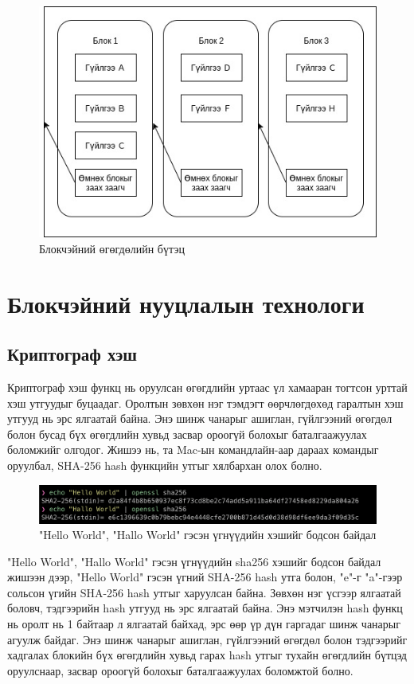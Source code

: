 \begin{figure}[h]
	\centering
	\includegraphics[scale=0.8]{src/images/blockchain-structure.jpg}
	\caption{Блокчэйний өгөгдөлийн бүтэц}
\end{figure}

\section{Блокчэйний нууцлалын технологи}
\subsection{Криптограф хэш}
Криптограф хэш функц нь оруулсан өгөгдлийн уртаас үл хамааран тогтсон урттай хэш утгуудыг буцаадаг. Оролтын зөвхөн нэг тэмдэгт өөрчлөгдөхөд гаралтын хэш утгууд нь эрс ялгаатай байна. Энэ шинж чанарыг ашиглан, гүйлгээний өгөгдөл болон бусад бүх өгөгдлийн хувьд засвар ороогүй болохыг баталгаажуулах боломжийг олгодог.
Жишээ нь, та Mac-ын командлайн-аар дараах командыг оруулбал, SHA-256 hash функцийн утгыг хялбархан олох болно.

\begin{figure}[h]
	\centering
	\includegraphics[scale=0.32]{src/images/hash-example.png}
	\caption{"Hello World", "Hallo World" гэсэн үгнүүдийн хэшийг бодсон байдал}
\end{figure}

"Hello World", "Hallo World" гэсэн үгнүүдийн sha256 хэшийг бодсон байдал жишээн дээр, "Hello World" гэсэн үгний SHA-256 hash утга болон, "e"-г "a"-гээр сольсон үгийн SHA-256 hash утгыг харуулсан байна. Зөвхөн нэг үсгээр ялгаатай боловч, тэдгээрийн hash утгууд нь эрс ялгаатай байна. Энэ мэтчилэн hash функц нь оролт нь 1 байтаар л ялгаатай байхад, эрс өөр үр дүн гаргадаг шинж чанарыг агуулж байдаг. Энэ шинж чанарыг ашиглан, гүйлгээний өгөгдөл болон тэдгээрийг хадгалах блокийн бүх өгөгдлийн хувьд гарах hash утгыг тухайн өгөгдлийн бүтцэд оруулснаар, засвар ороогүй болохыг баталгаажуулах боломжтой болно.


